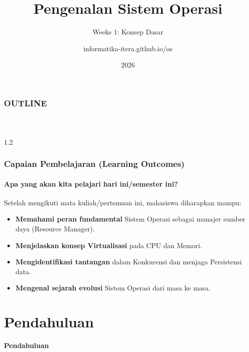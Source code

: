 \documentclass[t,aspectratio=169,xcolor=dvipsnames]{beamer}
\title[Pengenalan OS]{Pengenalan Sistem Operasi}
\subtitle{Weeks 1: Konsep Dasar}
\author[informatika-itera.github.io/os]{informatika-itera.github.io/os}
\institute[ITERA]{Program Studi Teknik Informatika \\ Institut Teknologi Sumatera}
\date{\textcolor{nyublue}{2026}}
\begin{document}
\begin{frame}[plain]

    \titlepage
    
\end{frame}

\begin{frame}[plain]

    \frametitle{OUTLINE} 
    \framesubtitle{~}

    \begin{spacing}{1.2}
        \tableofcontents
    \end{spacing}
    
\end{frame}

\begin{frame}[t]
    \frametitle{Capaian Pembelajaran (Learning Outcomes)}
    \framesubtitle{Apa yang akan kita pelajari hari ini/semester ini?}

    Setelah mengikuti mata kuliah/pertemuan ini, mahasiswa diharapkan mampu:
    \begin{itemize}
        \item \textbf{Memahami peran fundamental} Sistem Operasi sebagai manajer sumber daya (Resource Manager).
        \item \textbf{Menjelaskan konsep Virtualisasi} pada CPU dan Memori.
        \item \textbf{Mengidentifikasi tantangan} dalam Konkurensi dan menjaga Persistensi data.
        \item \textbf{Mengenal sejarah evolusi} Sistem Operasi dari masa ke masa.
    \end{itemize}
\end{frame}

\section{Pendahuluan}

\begin{frame}[plain]
    \begin{center}
        \vspace{3cm}
        \Huge\textbf{Pendahuluan}
    \end{center}
\end{frame}
\end{document}
